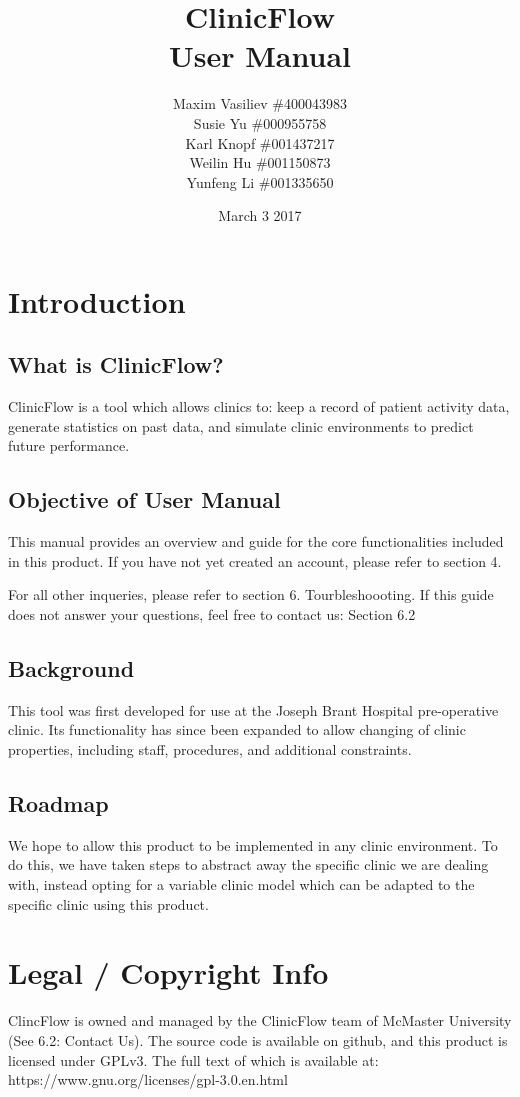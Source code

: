 \documentclass[12pt]{article}
\title{
ClinicFlow
\\\vspace{10mm}
\large \textbf{User Manual}
\vspace{40mm}
}
\author{ Maxim Vasiliev \#400043983\\
Susie Yu \#000955758\\
Karl Knopf \#001437217\\
Weilin Hu \#001150873\\
Yunfeng Li \#001335650
}
\date{March 3 2017}
\begin{document}
\maketitle
\newpage
\tableofcontents
\listoffigures
\newpage
{}


\section{Introduction}

\subsection{What is ClinicFlow?}
ClinicFlow is a tool which allows clinics to: keep a record of patient activity data, generate statistics on past data, and simulate clinic environments to predict future performance.

\subsection{Objective of User Manual}
This manual provides an overview and guide for the core functionalities included in this product. If you have not yet created an account, please refer to section 4.
\medbreak

For all other inqueries, please refer to section 6. Tourbleshoooting. If this guide does not answer your questions, feel free to contact us: Section 6.2

\subsection{Background}
This tool was first developed for use at the Joseph Brant Hospital pre-operative clinic. Its functionality has since been expanded to allow changing of clinic properties, including staff, procedures, and additional constraints.

\subsection{Roadmap}
We hope to allow this product to be implemented in any clinic environment. To do this, we have taken steps to abstract away the specific clinic we are dealing with, instead opting for a variable clinic model which can be adapted to the specific clinic using this product.

\section{Legal / Copyright Info}
ClincFlow is owned and managed by the ClinicFlow team of McMaster University (See 6.2: Contact Us). The source code is available on github, and this product is licensed under GPLv3. The full text of which is available at:
\medbreak
https://www.gnu.org/licenses/gpl-3.0.en.html
\end{document}
